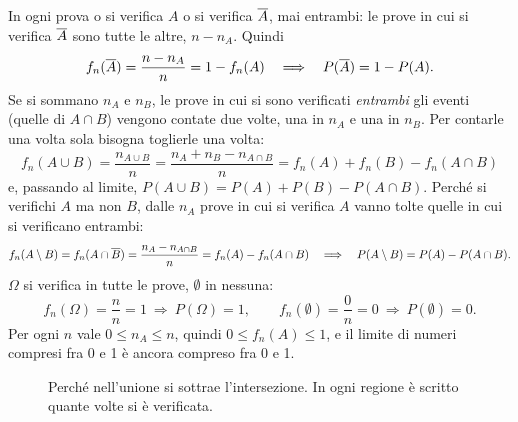 \begin{dimostrazione}
 In ogni prova o si verifica $A$ o si verifica $\overline{A}$, mai entrambi: le prove in cui si
verifica $\overline{A}$ sono tutte le altre, $n - n_A$. Quindi
\[ f_n(\overline{A}) = \frac{n - n_A}{n} = 1 - f_n(A) \quad\Longrightarrow\quad P(\overline{A}) = 1 - P(A) . \]
 Se si sommano $n_A$ e $n_B$, le prove in cui si sono verificati \emph{entrambi} gli eventi (quelle di
$A \cap B$) vengono contate due volte, una in $n_A$ e una in $n_B$. Per contarle una volta sola bisogna toglierle una
volta:
\[
  f_n(A \cup B) = \frac{n_{A \cup B}}{n} = \frac{n_A + n_B - n_{A \cap B}}{n} = f_n(A) + f_n(B) - f_n(A \cap B)
\]
e, passando al limite, $P(A \cup B) = P(A) + P(B) - P(A \cap B)$.
 Perché si verifichi $A$ ma non $B$, dalle $n_A$ prove in cui si verifica $A$ vanno tolte quelle
in cui si verificano entrambi:
\[
  f_n(A \setminus B) = f_n(A \cap \overline{B}) = \frac{n_A - n_{A \cap B}}{n} = f_n(A) - f_n(A \cap B)
  \quad\Longrightarrow\quad P(A \setminus B) = P(A) - P(A \cap B) .
\]
 $\Omega$ si verifica in tutte le prove, $\emptyset$ in nessuna:
\[ f_n(\Omega) = \frac{n}{n} = 1 \ \Longrightarrow\ P(\Omega) = 1 , \qquad
   f_n(\emptyset) = \frac{0}{n} = 0 \ \Longrightarrow\ P(\emptyset) = 0 . \]
 Per ogni $n$ vale $0 \leq n_A \leq n$, quindi $0 \leq f_n(A) \leq 1$, e il limite di numeri compresi
fra 0 e 1 è ancora compreso fra 0 e 1.
\end{dimostrazione}

\begin{figure}[H]
\centering
{}
\caption{Perché nell'unione si sottrae l'intersezione. In ogni regione è scritto quante volte si è verificata.}
\end{figure}

